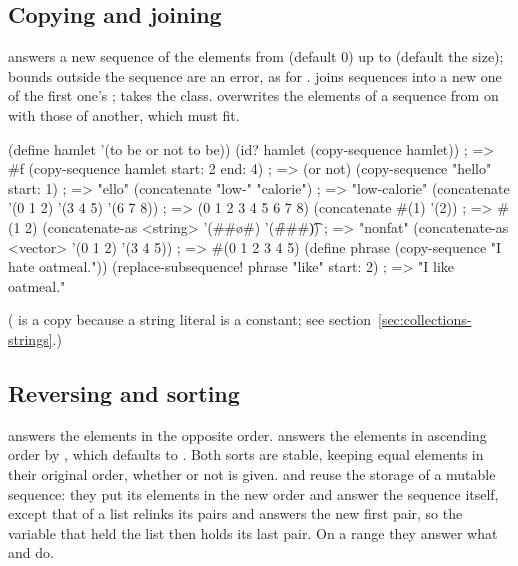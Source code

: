 \subsection{Copying and joining}

 answers a new sequence of the elements from
 (default 0) up to  (default the size); bounds
outside the sequence are an error, as for .
 joins sequences into a new one of the first one's
;  takes the class.
 overwrites the elements of a sequence from
 on with those of another, which must fit.

\begin{dylan}
(define hamlet '(to be or not to be))
(id? hamlet (copy-sequence hamlet))          ; => #f
(copy-sequence hamlet start: 2 end: 4)       ; => (or not)
(copy-sequence "hello" start: 1)             ; => "ello"
(concatenate "low-" "calorie")               ; => "low-calorie"
(concatenate '(0 1 2) '(3 4 5) '(6 7 8))     ; => (0 1 2 3 4 5 6 7 8)
(concatenate #(1) '(2))                      ; => #(1 2)
(concatenate-as <string> '(#\n #\o #\n) '(#\f #\a #\t))   ; => "nonfat"
(concatenate-as <vector> '(0 1 2) '(3 4 5))  ; => #(0 1 2 3 4 5)
(define phrase (copy-sequence "I hate oatmeal."))
(replace-subsequence! phrase "like" start: 2)  ; => "I like oatmeal."
\end{dylan}

\noindent ( is a copy because a string literal is a
constant; see section~\ref{sec:collections-strings}.)

\subsection{Reversing and sorting}

 answers the elements in the opposite order. 
answers the elements in ascending order by , which defaults
to \code{<}. Both sorts are stable, keeping equal elements in their
original order, whether or not  is given.
 and  reuse the storage of a mutable
sequence: they put its elements in the new order and answer the
sequence itself, except that  of a list relinks its pairs
and answers the new first pair, so the variable that held the list then
holds its last pair. On a range they answer what  and
 do.


